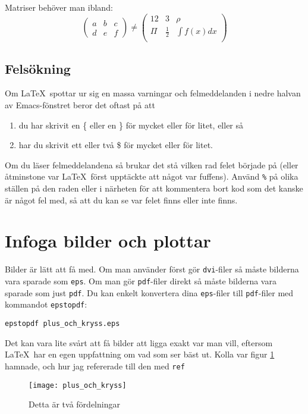 \documentclass[11pt,a4paper]{article}
\begin{document}
Matriser behöver man ibland:
$$
\begin{pmatrix}
a & b & c \\
d & e & f
\end{pmatrix}
\neq 
\begin{pmatrix}
12 & 3 & \rho \\
\Pi & \frac{1}{2} & \int f(x)dx \\
\end{pmatrix}
$$


\subsection{Felsökning}

Om \LaTeX\ spottar ur sig en massa varningar och felmeddelanden i nedre halvan av Emacs-fönstret beror det oftast på att
\begin{enumerate}
\item du har skrivit en \{ eller en \} för mycket eller för litet, eller så
\item har du skrivit ett eller två \$ för mycket eller för litet. 
\end{enumerate}
 Om du läser felmeddelandena så brukar det stå vilken rad felet började på (eller åtminstone var \LaTeX\ först upptäckte att något var fuffens). Använd \texttt{\%} på olika ställen på den raden eller i närheten för att kommentera bort kod som det kanske är något fel med, så att du kan se var felet finns eller inte finns.


\section{Infoga bilder och plottar}\label{infoga_bilder}

Bilder är lätt att få med. Om man använder först gör \texttt{dvi}-filer så måste bilderna vara sparade som \texttt{eps}. Om man gör \texttt{pdf}-filer direkt så måste bilderna vara sparade som just \texttt{pdf}. Du kan enkelt konvertera dina \texttt{eps}-filer till \texttt{pdf}-filer med kommandot \texttt{epstopdf}:
\begin{verbatim}
epstopdf plus_och_kryss.eps
\end{verbatim}

Det kan vara lite svårt att få bilder att ligga exakt var man vill, eftersom \LaTeX\ har en egen uppfattning om vad som ser bäst ut. Kolla var figur \ref{en_figur} hamnade, och hur jag refererade till den med \texttt{ref}

\begin{figure}[t] %
\centering
\texttt{[image: plus\_och\_kryss]} %
\caption{Detta är två fördelningar}\label{en_figur}
\end{figure}
\end{document}
